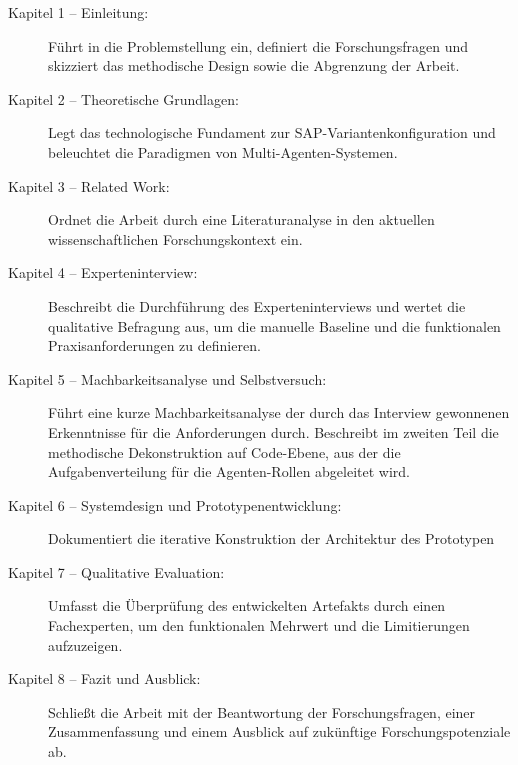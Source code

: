 \begin{description}
    \item[Kapitel 1 -- Einleitung:] Führt in die Problemstellung ein, definiert die Forschungsfragen und skizziert das methodische Design sowie die Abgrenzung der Arbeit.
    \item[Kapitel 2 -- Theoretische Grundlagen:] Legt das technologische Fundament zur SAP-Variantenkonfiguration und beleuchtet die Paradigmen von Multi-Agenten-Systemen.
    \item[Kapitel 3 -- Related Work:] Ordnet die Arbeit durch eine Literaturanalyse in den aktuellen wissenschaftlichen Forschungskontext ein.
    \item[Kapitel 4 -- Experteninterview:] Beschreibt die Durchführung des Experteninterviews und wertet die qualitative Befragung aus, um die manuelle Baseline und die funktionalen Praxisanforderungen zu definieren.
    \item[Kapitel 5 -- Machbarkeitsanalyse und Selbstversuch:] Führt eine kurze Machbarkeitsanalyse der durch das Interview gewonnenen Erkenntnisse für die Anforderungen durch. Beschreibt im zweiten Teil die methodische Dekonstruktion auf Code-Ebene, aus der die Aufgabenverteilung für die Agenten-Rollen abgeleitet wird.
    \item[Kapitel 6 -- Systemdesign und Prototypenentwicklung:] Dokumentiert die iterative Konstruktion der Architektur des Prototypen
    \item[Kapitel 7 -- Qualitative Evaluation:] Umfasst die Überprüfung des entwickelten Artefakts durch einen Fachexperten, um den funktionalen Mehrwert und die Limitierungen aufzuzeigen.
    \item[Kapitel 8 -- Fazit und Ausblick:] Schließt die Arbeit mit der Beantwortung der Forschungsfragen, einer Zusammenfassung und einem Ausblick auf zukünftige Forschungspotenziale ab.
\end{description}